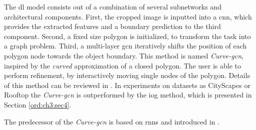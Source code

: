 The \gls{dl} model consists out of a combination of several subnetworks and architectural components.
First, the cropped image is inputted into a \gls{cnn}, which provides the extracted features and a boundary prediction to the third component.
Second, a fixed size polygon is initialized, to transform the task into a graph problem.
Third, a multi-layer \gls{gcn} iteratively shifts the position of each polygon node towards the object boundary. 
This method is named \textit{Curve-\gls{gcn}}, inspired by the \textit{curved} approximation of a closed polygon.
The user is able to perform refinement, by interactively moving single nodes of the polygon.
Details of this method can be reviewed in \cite{Ling19-Curve-GCN}.
In experiments on datasets as CityScapes or Rooftop the \textit{Curve-\gls{gcn}} is outperformed by the \gls{iog} method, which is presented in Section \ref{ord:ch3:sec4}.

The predecessor of the \textit{Curve-\gls{gcn}} is based on \glspl{rnn} and introduced in \cite{Acu18-Polygon-RNN++}.






